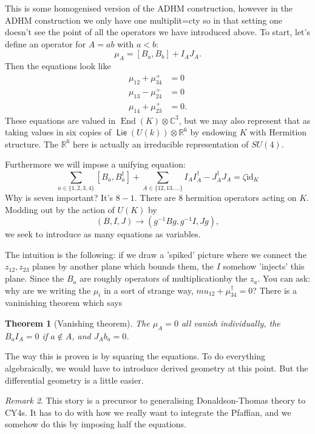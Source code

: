 \documentclass[leqno, openany]{memoir}
\newtheorem{thm}{Theorem}[section]
\theoremstyle{definition}
\theoremstyle{remark}
\newtheorem{rmk}[thm]{Remark}
\theoremstyle{plain}
\theoremstyle{definition}
\theoremstyle{remark}
\newcommand{\mr}[1]{\mathrm{#1}}
\newcommand{\ms}[1]{\mathsf{#1}}
\DeclareMathOperator{\End}{End}
\DeclareMathOperator{\Lie}{\ms{Lie}}
\begin{document}
This is some homogenised version of the ADHM construction, 
however in the ADHM construction we only have one multiplit=cty 
so in that setting one doesn't see the point of all the operators 
we have introduced above.
To start, let's define an operator for $A = ab$ with $a < b$:
\[
\mu_A = [B_a, B_b] + I_A J_A .
\]
Then the equations look like 
\begin{align*}
    \mu_{12} + \mu_{34}^+ &= 0 \\
    \mu_{13} - \mu_{24}^+ &= 0 \\
    \mu_{14} + \mu_{23}^+ &= 0. 
\end{align*}
These equations are valued in $\End(K) \otimes \mathbb{C}^3$,
but we may also represent that as taking values in six copies of 
$\Lie(U(k)) \otimes \mathbb{R}^6$ by endowing $K$ with Hermition structure. 
The $\mathbb{R}^6$ here is actually an irreducible representation of $SU(4)$.

Furthermore we will impose a unifying equation: 
\[
\sum_{a \in \{1,2,3,4\}} [B_a, B_a^\dag] + \sum_{A \in \{12,13,\dots\}} I_A I_A^\dag - J_A^\dag J_A = \zeta \mr{id}_{K}
\]
Why is seven important? It's $8 -1$. There are $8$ hermition 
operators acting on $K$. Modding out by the action of $U(K)$ by 
\[
(B,I,J) \to (g^{-1} B g, g^{-1} I, J g),
\]
we seek to introduce as many equations as variables.


The intuition is the following: if we draw a 'spiked' picture where 
we connect the $z_{12}, z_{23}$ planes by another plane which bounds them, 
the $I$ somehow 'injects' this plane. Since the $B_a$ are roughly 
operators of multiplicationby the $z_a$. 
You can ask: why are we writing the $\mu_i$ in a sort of strange way, 
$mu_{12} + \mu_{34}^\dag = 0$?
There is a vaninishing theorem which says

\begin{thm}[Vanishing theorem]
The $\mu_A = 0$ all vanish individually, the $B_a I_A = 0$ if $a \not \in A$, and $J_A b_a = 0$. 
\end{thm}
The way this is proven is by squaring the equations.
To do everything algebraically, we would have to introduce derived geometry at this point.
But the differential geometry is a little easier. 

\begin{rmk}
This story is a precursor to generalising Donaldson-Thomas theory to CY4s. It has 
to do with how we really want to integrate the Pfaffian, and we somehow do this by imposing half the equations.
\end{rmk}
\end{document}
